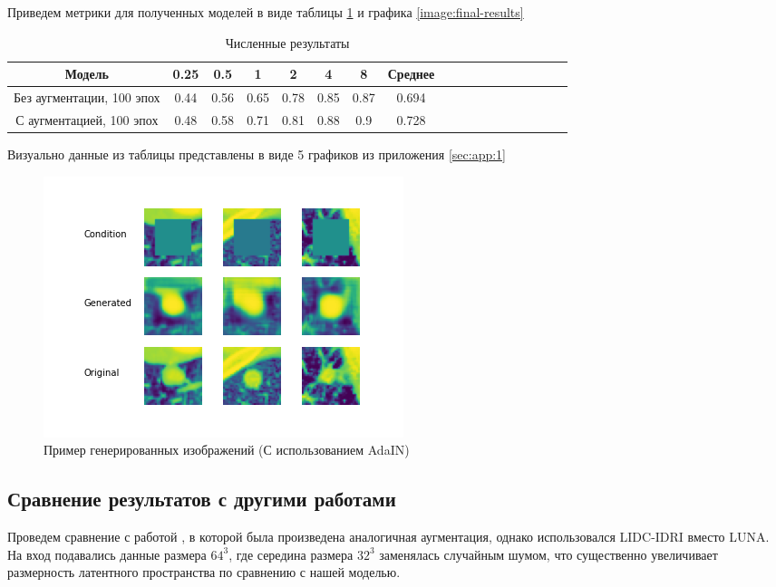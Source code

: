 Приведем метрики для полученных моделей в виде таблицы \ref{tab:result-metrics} и графика \ref{image:final-results}


\begin{table}[!h]
\caption{Численные результаты}\label{tab:result-metrics}
\centering
\begin{tabular}{|*{18}{c|}}\hline
\textbf{Модель} & \textbf{0.25} & \textbf{0.5} & \textbf{1} & \textbf{2} & \textbf{4} & \textbf{8} & \textbf{Среднее} \\\hline
Без аугментации, 100 эпох & 0.44 & 0.56 & 0.65 & 0.78 & 0.85 & 0.87 & 0.694 \\\hline
С аугментацией, 100 эпох & 0.48 & 0.58 & 0.71 & 0.81 & 0.88 & 0.9 & 0.728 \\\hline
\end{tabular}
\end{table}

Визуально данные из таблицы представлены в виде 5 графиков из приложения \ref{sec:app:1}

\begin{figure}[!h]
\includegraphics[width=\linewidth]{images/gan-results/adain.png}
\caption{Пример генерированных изображений (С использованием AdaIN)}\label{cgan-adain-results}
\centering
\end{figure}

\subsection{Сравнение результатов с другими работами}

Проведем сравнение с работой \cite{han2019synthesizing}, в которой была произведена аналогичная аугментация, однако использовался LIDC-IDRI вместо LUNA. На вход подавались данные размера $64^3$, где середина размера $32^3$ заменялась случайным шумом, что существенно увеличивает размерность латентного пространства по сравнению с нашей моделью.

